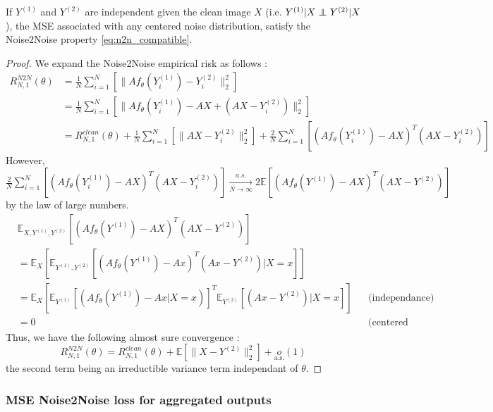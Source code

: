 \begin{proposition}
    \label{prop:noise2noise_l2}
    If $Y^{(1)}$ and $Y^{(2)}$ are independent given the clean image $X$ (i.e. $Y^{(1)} | X \independent Y^{(2)} | X$),
    the MSE associated with any centered noise distribution, satisfy the Noise2Noise property \eqref{eq:n2n_compatible}.
\end{proposition}
\begin{proof}
    We expand the Noise2Noise empirical risk as follows :
    \begin{align*}
        R_{N, 1}^{N2N}(\theta) &= \frac{1}{N} \sum_{i=1}^N \left[ \| Af_\theta(Y_i^{(1)}) - Y_i^{(2)} \|_2^2 \right] \\
        &= \frac{1}{N} \sum_{i=1}^N \left[ \| Af_\theta(Y_i^{(1)}) - AX + (AX - Y_i^{(2)}) \|_2^2 \right] \\
        &= R_{N, 1}^{clean}(\theta) + \frac{1}{N} \sum_{i=1}^N \left[ \| AX - Y_i^{(2)} \|_2^2 \right] + \frac{2}{N} \sum_{i=1}^N \left[ (Af_\theta(Y_i^{(1)}) - AX)^T (AX - Y_i^{(2)}) \right]
    \end{align*}
    However, $\frac{2}{N} \sum_{i=1}^N \left[ (Af_\theta(Y_i^{(1)}) - AX)^T (AX - Y_i^{(2)}) \right] \xrightarrow[N \to \infty]{a.s.} 2 \mathbb{E} \left[ (Af_\theta(Y^{(1)}) - AX)^T (AX - Y^{(2)}) \right]$ by the law of large numbers.
    \begin{align*}
        &\mathbb{E}_{X, Y^{(1)}, Y^{(2)}} \left[ (Af_\theta(Y^{(1)}) - AX)^T (AX - Y^{(2)}) \right] \\
        &= \mathbb{E}_{X} \left[ \mathbb{E}_{Y^{(1)}, Y^{(2)}} \left[ (Af_\theta(Y^{(1)}) - Ax)^T (Ax - Y^{(2)}) | X=x \right] \right] \\
        &= \mathbb{E}_{X} \left[ \mathbb{E}_{Y^{(1)}} \left[ (Af_\theta(Y^{(1)}) - Ax | X=x)\right]^T \mathbb{E}_{Y^{(2)}} \left[ (Ax - Y^{(2)}) | X=x \right] \right] && \text{(independance)} \\
        &= 0 && \text{(centered noise)}
    \end{align*}
    Thus, we have the following almost sure convergence :
    \begin{equation*}
        R_{N, 1}^{N2N}(\theta) = R_{N, 1}^{clean}(\theta) + \mathbb{E} \left[ \| X - Y^{(2)} \|_2^2 \right] + \underset{\text{a.s.}}{o}(1)
    \end{equation*}
    the second term being an irreductible variance term independant of $\theta$.
\end{proof}

\subsubsection{MSE Noise2Noise loss for aggregated outputs}


